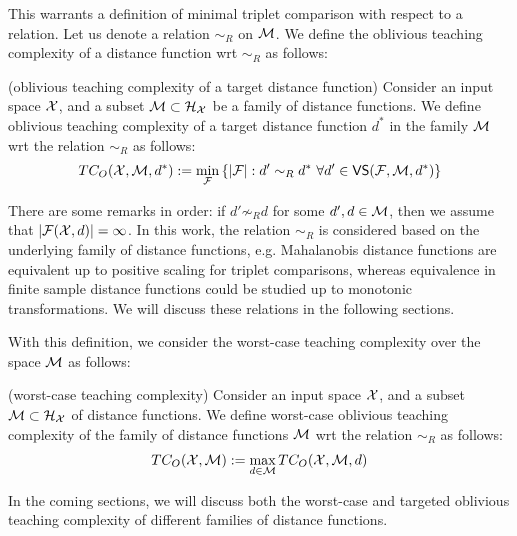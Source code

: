 This warrants a definition of minimal triplet comparison with respect to a relation. Let us denote a relation $\sim_R$ on ${\mathcal{M}}$. We define the oblivious teaching complexity of a distance function wrt $\sim_R$ as follows:

\begin{definition}(oblivious teaching complexity of a target distance function)
    Consider an input space ${\mathcal{X}}$, and a subset ${\mathcal{M}} \subset {\mathcal{H}}_{{\mathcal{X}}}$ be a family of distance functions. We define oblivious teaching complexity of a target distance function $d^*$ in the family ${\mathcal{M}}$ wrt the relation $\sim_R$ as follows:
    \begin{align*}
        TC_O({\mathcal{X}}, {\mathcal{M}}, d^*) := \min_{{\mathcal{F}}} \left\{|{\mathcal{F}}|: d' \sim_R d^* \ \forall d' \in \textsf{VS}({\mathcal{F}}, {\mathcal{M}}, d^*) \right\}
    \end{align*}
\end{definition}

There are some remarks in order: if $d' \not \sim_R d$ for some $d',d \in {\mathcal{M}}$, then we assume that $|{\mathcal{F}}({\mathcal{X}},d)| = \infty$. In this work, the relation $\sim_R$ is considered based on the underlying family of distance functions, e.g. Mahalanobis distance functions are equivalent up to positive scaling for triplet comparisons, whereas equivalence in finite sample distance functions could be studied up to monotonic transformations. We will discuss these relations in the following sections.

With this definition, we consider the worst-case teaching complexity over the space ${\mathcal{M}}$ as follows:

\begin{definition}(worst-case teaching complexity)
    Consider an input space ${\mathcal{X}}$, and a subset ${\mathcal{M}} \subset {\mathcal{H}}_{{\mathcal{X}}}$ of distance functions. We define worst-case oblivious teaching complexity of the family of distance functions ${\mathcal{M}}$ wrt the relation $\sim_R$ as follows:
    \begin{align*}
        TC_O(\cX, \cM) := \max_{d \in \cM} TC_O(\cX, \cM, d)%
    \end{align*}
\end{definition}
In the coming sections, we will discuss both the worst-case and targeted oblivious teaching complexity of different families of distance functions.
\fi 


